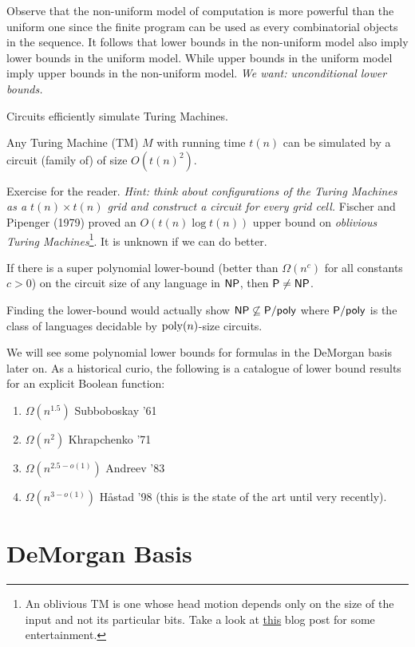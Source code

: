 \documentclass[11pt]{article}
\begin{document}
	Observe that the non-uniform model of computation is more powerful than the uniform one since the finite program can be used as every combinatorial objects in the sequence. It follows that lower bounds in the non-uniform model also imply lower bounds in the uniform model. While upper bounds in the uniform model imply upper bounds in the non-uniform model. \emph{We want: unconditional lower bounds.} 
	
	Circuits efficiently simulate Turing Machines. 
	\begin{lemma}
		Any Turing Machine (TM) $M$ with running time $t(n)$ can be simulated by a circuit (family of) of size $O\left(t(n)^2\right)$.
	\end{lemma}
	Exercise for the reader. \emph{Hint: think about configurations of the Turing Machines as a $t(n) \times t(n)$ grid and construct a circuit for every grid cell.} Fischer and Pipenger (1979) proved an $O(t(n)\log t(n))$ upper bound on \emph{oblivious Turing Machines}\footnote{An oblivious TM is one whose head motion depends only on the size of the input and not its particular bits. Take a look at \href{https://rjlipton.wordpress.com/2009/07/28/oblivious-turing-machines-and-a-crock/}{this} blog post for some entertainment.}. It is unknown if we can do better. 
	
	\begin{corollary}
		If there is a super polynomial lower-bound (better than $\Omega(n^c)$ for all constants $c > 0$) on the circuit size of any language in $\mathsf{NP}$, then $\mathsf{P} \neq \mathsf{NP}$. 
	\end{corollary}
	Finding the lower-bound would actually show $\mathsf{NP} \not\subseteq \mathsf{P/poly}$ where $\mathsf{P/poly}$ is the class of languages decidable by $\operatorname*{poly}(n)$-size circuits.
	
	We will see some polynomial lower bounds for formulas in the DeMorgan basis later on. As a historical curio, the following is a catalogue of lower bound results for an explicit Boolean function:
	\begin{enumerate}
		\item $\Omega(n^{1.5})$ Subboboskay '61
		\item $\Omega(n^{2})$ Khrapchenko '71
		\item $\Omega(n^{2.5 - o(1)})$ Andreev '83
		\item $\Omega(n^{3 - o(1)})$ H\aa stad '98 (this is the state of the art until very recently). 
	\end{enumerate}
	
	\section{DeMorgan Basis}
\end{document}
